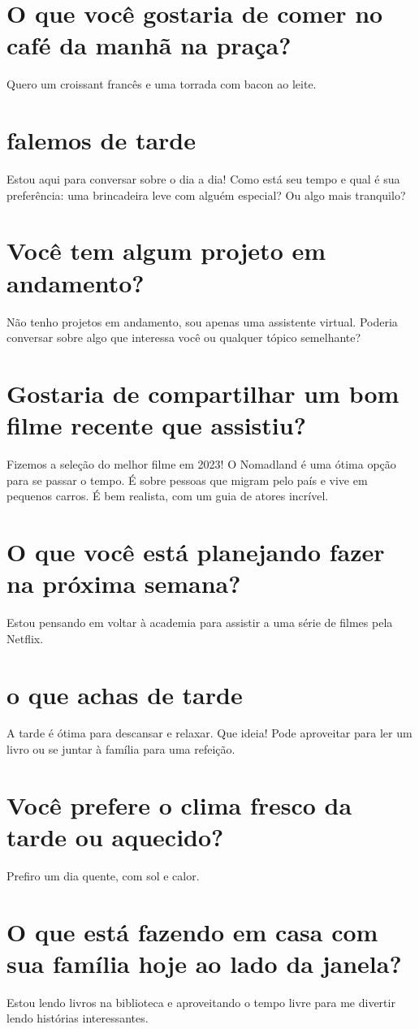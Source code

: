 \documentclass[11pt,a4paper]{article}
\begin{document}
\section{O que você gostaria de comer no café da manhã na praça?}
Quero um croissant francês e uma torrada com bacon ao leite.

\section{falemos de tarde}
Estou aqui para conversar sobre o dia a dia! Como está seu tempo e qual é sua preferência: uma brincadeira leve com alguém especial? Ou algo mais tranquilo?

\section{Você tem algum projeto em andamento?}
Não tenho projetos em andamento, sou apenas uma assistente virtual. Poderia conversar sobre algo que interessa você ou qualquer tópico semelhante?

\section{Gostaria de compartilhar um bom filme recente que assistiu?}
Fizemos a seleção do melhor filme em 2023! O Nomadland é uma ótima opção para se passar o tempo. É sobre pessoas que migram pelo país e vive em pequenos carros. É bem realista, com um guia de atores incrível.

\section{O que você está planejando fazer na próxima semana?}
Estou pensando em voltar à academia para assistir a uma série de filmes pela Netflix.

\section{o que achas de tarde}
A tarde é ótima para descansar e relaxar. Que ideia! Pode aproveitar para ler um livro ou se juntar à família para uma refeição.

\section{Você prefere o clima fresco da tarde ou aquecido?}
Prefiro um dia quente, com sol e calor.

\section{O que está fazendo em casa com sua família hoje ao lado da janela?}
Estou lendo livros na biblioteca e aproveitando o tempo livre para me divertir lendo histórias interessantes.
\end{document}
